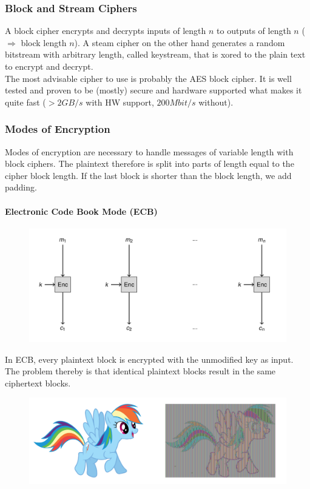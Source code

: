 \subsubsection{Block and Stream Ciphers}
A block cipher encrypts and decrypts inputs of length $n$ to outputs of length $n$ ($\Rightarrow$ block length $n$).
A steam cipher on the other hand generates a random bitstream with arbitrary length, called keystream, that is xored to the plain text to encrypt and decrypt.\\
The most advisable cipher to use is probably the AES block cipher.
It is well tested and proven to be (mostly) secure and hardware supported what makes it quite fast ($>2GB/s$ with HW support, $200Mbit/s$ without).

\subsubsection{Modes of Encryption}
Modes of encryption are necessary to handle messages of variable length with block ciphers.
The plaintext therefore is split into parts of length equal to the cipher block length.
If the last block is shorter than the block length, we add padding.

\paragraph{Electronic Code Book Mode (ECB)}
\begin{figure}[H]
  \centering
  \includegraphics[width=.8\textwidth]{figures/ecb.png}
\end{figure}
In ECB, every plaintext block is encrypted with the unmodified key as input.
The problem thereby is that identical plaintext blocks result in the same ciphertext blocks.
\begin{figure}[H]
  \centering
  \includegraphics[width=.8\textwidth]{figures/ecb_problem.png}
\end{figure}

